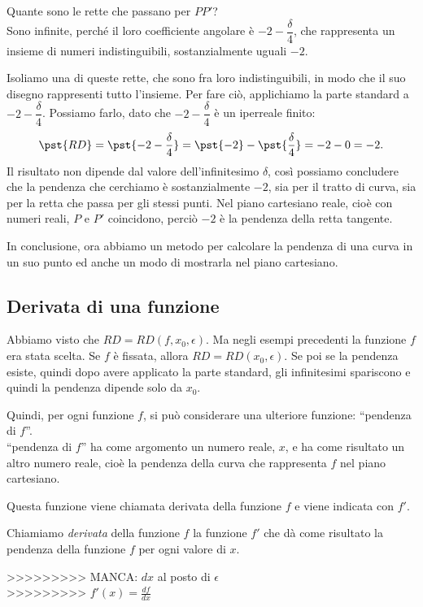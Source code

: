 \begin{esempio}
Quante sono le rette che passano per \(PP'\)?\\
Sono infinite, perché il loro coefficiente angolare è \(-2-\dfrac{\delta}{4}\), 
che rappresenta un insieme di numeri indistinguibili, sostanzialmente uguali 
\(-2\). 

Isoliamo una di queste rette, che sono fra loro indistinguibili, in modo che 
il suo disegno rappresenti tutto l'insieme. Per fare ciò, applichiamo la parte 
standard a \(-2-\dfrac{\delta}{4}\).
Possiamo farlo, dato che \(-2-\dfrac{\delta}{4}\) è un iperreale finito:
\[
\pst{RD}=\pst{-2-\dfrac{\delta}{4}} = \pst{-2}-\pst{\dfrac{\delta}{4}} =
  -2 - 0 = -2.
\]
Il risultato non dipende dal valore dell'infinitesimo \(\delta\), così 
possiamo concludere che la pendenza che cerchiamo è sostanzialmente \(-2\), sia 
per il tratto di curva, sia per la retta che passa per gli stessi 
punti.
Nel piano cartesiano reale, cioè con numeri reali, \(P\) e \(P'\) coincidono, 
perciò \(-2\) è la pendenza della retta tangente.
\end{esempio}

In conclusione, ora abbiamo un metodo per calcolare la pendenza di una curva in 
un suo punto ed anche un modo di mostrarla nel piano cartesiano. 



\subsection{Derivata di una funzione}
\label{subsec:differenziazione_derivatafunzione}
Abbiamo visto che \(RD=RD(f, x_0, \epsilon)\). Ma negli esempi precedenti la 
funzione \(f\) era stata scelta. Se \(f\) è fissata, allora 
\(RD=RD(x_0,\epsilon)\). Se poi se la pendenza esiste, quindi dopo avere 
applicato la parte standard, gli infinitesimi spariscono e quindi la 
pendenza dipende solo da \(x_0\).

Quindi, per ogni funzione \(f\), si può considerare una ulteriore funzione:  
``pendenza di \(f\)''. \\
``pendenza di \(f\)'' ha come argomento un numero reale, \(x\), 
e ha come risultato un altro numero reale, cioè la pendenza della curva che 
rappresenta \(f\) nel piano cartesiano.

Questa funzione viene chiamata derivata della funzione \(f\) 
e viene indicata con \(f'\).

\begin{definizione}
Chiamiamo \emph{derivata} della funzione \(f\) la funzione \(f'\) che
dà come risultato la pendenza della funzione \(f\) per ogni valore 
di \(x\).
\end{definizione}
>>>>>>>>> MANCA: \(dx\) al posto di \(\epsilon\)\\
>>>>>>>>> \(f'(x)=\frac{df}{dx}\)\\


